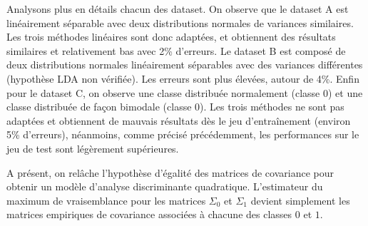 \documentclass{article}
\begin{document}
\begin{enumerate}[label=(\alph*)]
Analysons plus en détails chacun des dataset. On observe que le dataset A est linéairement séparable avec deux distributions normales de variances similaires. Les trois méthodes linéaires sont donc adaptées, et obtiennent des résultats similaires et relativement bas avec 2\% d'erreurs. Le dataset B est composé de deux distributions normales linéairement séparables avec des variances différentes (hypothèse LDA non vérifiée). Les erreurs sont plus élevées, autour de 4\%. Enfin pour le dataset C, on observe une classe distribuée normalement (classe 0) et une classe distribuée de façon bimodale (classe 0). Les trois méthodes ne sont pas adaptées et obtiennent de mauvais résultats dès le jeu d'entraînement (environ 5\% d'erreurs), néanmoins, comme précisé précédemment, les performances sur le jeu de test sont légèrement supérieures.
\end{enumerate}


A présent, on relâche l'hypothèse d'égalité des matrices de covariance pour obtenir un modèle d'analyse discriminante quadratique. L'estimateur du maximum de vraisemblance pour les matrices $\Sigma_0$ et $\Sigma_1$ devient simplement les matrices empiriques de covariance associées à chacune des classes $0$ et $1$.
\end{document}
